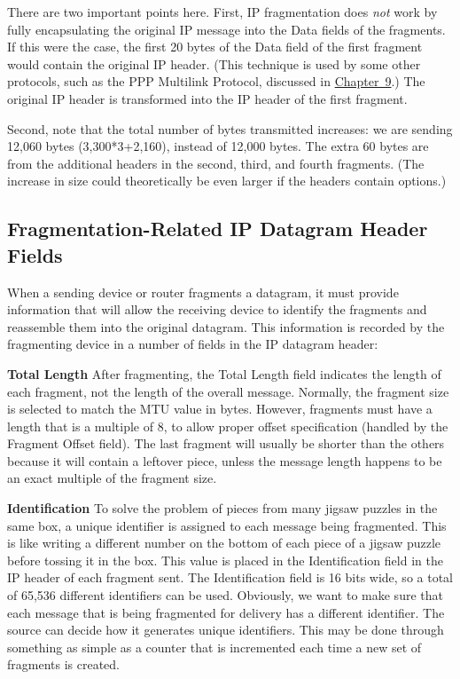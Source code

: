 \documentclass[b5paper,11pt]{memoir}
\begin{document}
There are two important points here. First, IP fragmentation does
{\emph{not}} work by fully encapsulating the original IP message into
the Data fields of the fragments. If this were the case, the first 20
bytes of the Data field of the first fragment would contain the original
IP header. (This technique is used by some other protocols, such as the
PPP Multilink Protocol, discussed in
\protect\hyperlink{ch09.html}{Chapter~9}.) The original IP header is
transformed into the IP header of the first fragment.

Second, note that the total number of bytes transmitted increases: we
are sending 12,060 bytes (3,300*3+2,160), instead of 12,000 bytes. The
extra 60 bytes are from the additional headers in the second, third, and
fourth fragments. (The increase in size could theoretically be even
larger if the headers contain options.)

\subsection[Fragmentation-Related IP Datagram Header
Fields]{\texorpdfstring{\protect\hypertarget{ch22s02.htmlux5cux23fragmentation-related_ip_datagram_header}{}{}Fragmentation-Related
IP Datagram Header
Fields}{Fragmentation-Related IP Datagram Header Fields}}

\protect\hypertarget{ch22s02.htmlux5cux23idx-CHP-22-0809}{}{}When a
sending device or router fragments a datagram, it must provide
information that will allow the receiving device to identify the
fragments and reassemble them into the original datagram. This
information is recorded by the fragmenting device in a number of fields
in the IP datagram header:

{\textbf{Total Length}} After fragmenting, the
\protect\hypertarget{ch22s02.htmlux5cux23idx-CHP-22-0810}{}{}Total
Length field indicates the length of each fragment, not the length of
the overall message. Normally, the fragment size is selected to match
the MTU value in bytes. However, fragments must have a length that is a
multiple of 8, to allow proper offset specification (handled by the
Fragment Offset field). The last fragment will usually be shorter than
the others because it will contain a leftover piece, unless the message
length happens to be an exact multiple of the fragment size.

{\textbf{Identification}} To solve the problem of pieces from many
jigsaw puzzles in the same box, a unique identifier is assigned to each
message being fragmented. This is like writing a different number on the
bottom of each piece of a jigsaw puzzle before tossing it in the box.
This value is placed in the Identification field in the IP header of
each fragment sent. The Identification field is 16 bits wide, so a total
of 65,536 different identifiers can be used. Obviously, we want to make
sure that each message that is being fragmented for delivery has a
different identifier. The source can decide how it generates unique
identifiers. This may be done through something as simple as a counter
that is incremented each time a new set of fragments is created.
\end{document}
